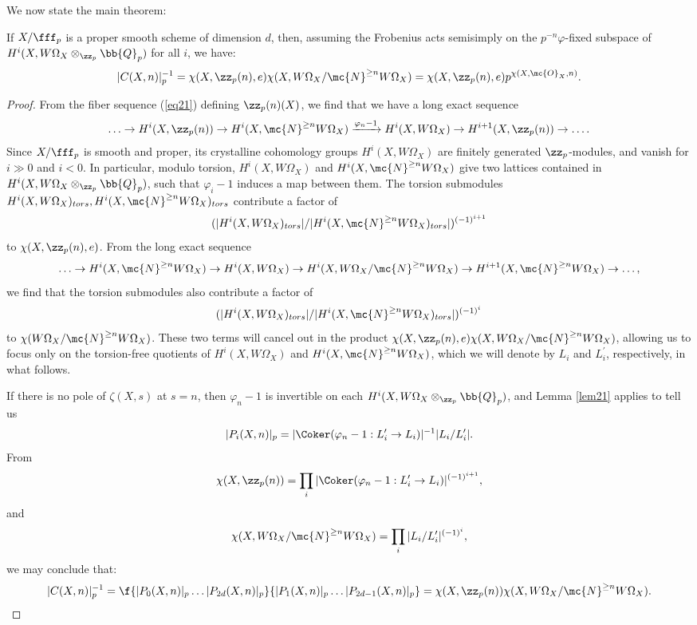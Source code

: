 We now state the main theorem:
\begin{theorem}\label{main2}
If $X/\fff_p$ is a proper smooth scheme of dimension $d$, then, assuming the Frobenius acts semisimply on the $p^{-n}\varphi$-fixed subspace of $H^i(X,W\Omega_X\otimes_{\zz_p}\bb{Q}_p)$ for all $i$, we have:
$$|C(X,n)|_{p}^{-1}=\chi(X,\zz_p(n),e)\chi(X,W\Omega_X/\mc{N}^{\geq n}W\Omega_X)=\chi(X,\zz_p(n),e)p^{\chi(X,\mc{O}_X,n)}.$$ 
\end{theorem}
\begin{proof}
From the fiber sequence (\ref{eq21}) defining $\zz_p(n)(X)$, we find that we have a long exact sequence 
$$\ldots \to H^i(X,\zz_p(n))\to H^i(X,\mc{N}^{\geq n}W\Omega_{X})\xrightarrow{\varphi_n-1}H^i(X,W\Omega_X)\to H^{i+1}(X,\zz_p(n))\to\ldots.$$
Since $X/\fff_p$ is smooth and proper, its crystalline cohomology groups $H^i(X,W\Omega_X)$ are finitely generated $\zz_p$-modules, and vanish for $i\gg 0$ and $i<0$.  In particular, modulo torsion, $H^i(X,W\Omega_X)$ and $H^i(X,\mc{N}^{\geq n}W\Omega_X)$ give two lattices contained in $H^i(X,W\Omega_X\otimes_{\zz_p}\bb{Q}_p)$, such that $\varphi_i-1$ induces a map between them.  The torsion submodules $H^i(X,W\Omega_X)_{tors},H^i(X,\mc{N}^{\geq n}W\Omega_X)_{tors}$ contribute a factor of $$(|H^i(X,W\Omega_X)_{tors}|/|H^i(X,\mc{N}^{\geq n}W\Omega_X)_{tors}|)^{(-1)^{i+1}}$$ to $\chi(X,\zz_p(n),e)$.  From the long exact sequence
$$\ldots \to H^i(X,\mc{N}^{\geq n}W\Omega_{X})\to H^i(X,W\Omega_X)\to H^{i}(X,W\Omega_X/\mc{N}^{\geq n}W\Omega_X)\to H^{i+1}(X,\mc{N}^{\geq n}W\Omega_{X})\to\ldots,$$ we find that the torsion submodules also contribute a factor of $$(|H^i(X,W\Omega_X)_{tors}|/|H^i(X,\mc{N}^{\geq n}W\Omega_X)_{tors}|)^{(-1)^{i}}$$ to $\chi(W\Omega_X/\mc{N}^{\geq n}W\Omega_X)$.  These two terms will cancel out in the product $\chi(X,\zz_p(n),e)\chi(X,W\Omega_{X}/\mc{N}^{\geq n}W\Omega_{X})$, allowing us to focus only on the torsion-free quotients of $H^i(X,W\Omega_X)$ and $H^i(X,\mc{N}^{\geq n}W\Omega_X)$, which we will denote by $L_i$ and $L_i^{\prime}$, respectively, in what follows.

If there is no pole of $\zeta(X,s)$ at $s=n$, then $\varphi_n-1$ is invertible on each $H^i(X,W\Omega_X\otimes_{\zz_p} \bb{Q}_p)$, and Lemma \ref{lem21} applies to tell us $$|P_i(X,n)|_p=|\Coker(\varphi_n-1:L_i^{\prime}\to L_i)|^{-1}|L_i/L_i^{\prime}|.$$  From  $$\chi(X,\zz_p(n))=\prod_{i}|\Coker(\varphi_n-1:L_i^{\prime}\to L_i)|^{(-1)^{i+1}},$$ and $$\chi(X,W\Omega_X/\mc{N}^{\geq n}W\Omega_X)=\prod_{i}|L_i/L_i^{\prime}|^{(-1)^{i}},$$ we may conclude that:
$$|C(X,n)|_{p}^{-1}=\f{|P_0(X,n)|_p\ldots |P_{2d}(X,n)|_p}{|P_1(X,n)|_p\ldots |P_{2d-1}(X,n)|_p}=\chi(X,\zz_p(n))\chi(X,W\Omega_X/\mc{N}^{\geq n}W\Omega_X).$$


\end{proof}
